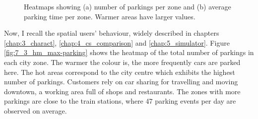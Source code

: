 \begin{figure}[th]
    \centering     %
    	\caption{Heatmaps showing (a) number of parkings per zone  and (b) average parking time per zone. Warmer areas have larger values. }
    	\label{fig:7_3_data_car}
\end{figure}

Now, I recall the spatial users' behaviour, widely described in chapters \ref{chap:3_charact}, \ref{chap:4_cs_comparison} and \ref{chap:5_simulator}.
Figure \ref{fig:7_3_hm_max-parking} shows the heatmap of the total number of parkings in each city zone. The warmer the colour is, the more frequently cars are parked here. The hot areas correspond to the city centre which exhibits the highest number of parkings. Customers rely on car sharing for travelling and moving downtown, a working area full of shops and restaurants. The zones with more parkings are close to the train stations, where 47 parking events per day are observed on average.

